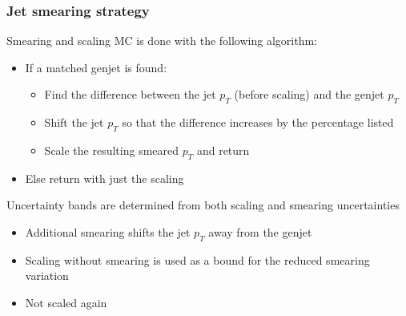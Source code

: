 \documentclass{beamer}
\begin{document}
\begin{frame}
  \frametitle{Jet smearing strategy}

  Smearing and scaling MC is done with the following algorithm:
  \begin{itemize}
  \item If a matched genjet is found:
    \begin{itemize}
    \item Find the difference between the jet $p_T$ (before scaling) and the genjet $p_T$
    \item Shift the jet $p_T$ so that the difference increases by the percentage listed
    \item Scale the resulting smeared $p_T$ and return
    \end{itemize}
  \item Else return with just the scaling
  \end{itemize}

  Uncertainty bands are determined from both scaling and smearing uncertainties
  \begin{itemize}
  \item Additional smearing shifts the jet $p_T$ away from the genjet
  \item Scaling without smearing is used as a bound for the reduced smearing variation
  \item Not scaled again
  \end{itemize}

\end{frame}
\end{document}

